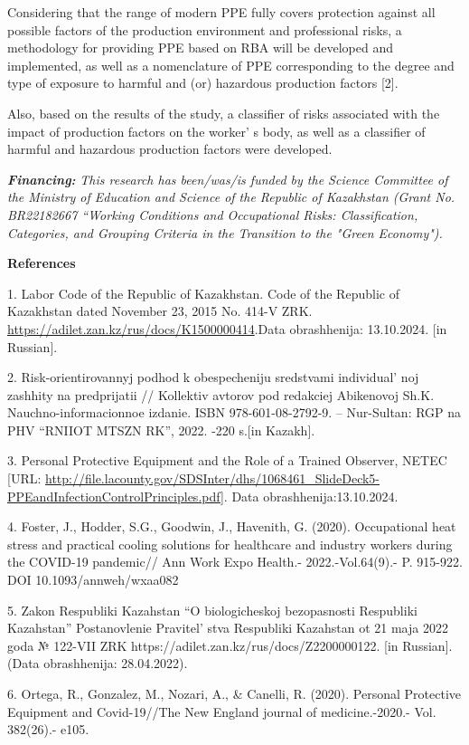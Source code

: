 {Considering that the range of modern PPE fully covers protection against
all possible factors of the production environment and professional
risks, a methodology for providing PPE based on RBA will be developed
and implemented, as well as a nomenclature of PPE corresponding to the
degree and type of exposure to harmful and (or) hazardous production
factors {[}2{]}.

Also, based on the results of the study, a classifier of risks
associated with the impact of production factors on the
worker' s body, as well as a classifier of harmful and
hazardous production factors were developed.

\emph{{\bfseries Financing:}} \emph{This research has been/was/is funded by
the Science Committee of the Ministry of Education and Science of the
Republic of Kazakhstan (Grant No. BR22182667 ``Working Conditions and
Occupational Risks: Classification, Categories, and Grouping Criteria in
the Transition to the "Green Economy").}

{\bfseries References}

1. Labor Code of the Republic of Kazakhstan. Code of the Republic of
Kazakhstan dated November 23, 2015 No. 414-V ZRK.
\url{https://adilet.zan.kz/rus/docs/K1500000414}.Data obrashhenija:
13.10.2024. {[}in Russian{]}.

2. Risk-orientirovannyj podhod k obespecheniju sredstvami
individual' noj zashhity na predprijatii // Kollektiv
avtorov pod redakciej Abikenovoj Sh.K. Nauchno-informacionnoe izdanie.
ISBN 978-601-08-2792-9. -- Nur-Sultan: RGP na PHV ``RNIIOT MTSZN RK'',
2022. -220 s.{[}in Kazakh{]}.

3. Personal Protective Equipment and the Role of a Trained Observer,
NETEC {[}URL:
\url{http://file.lacounty.gov/SDSInter/dhs/1068461_SlideDeck5-PPEandInfectionControlPrinciples.pdf}{]}.
Data obrashhenija:13.10.2024.

4. Foster, J., Hodder, S.G., Goodwin, J., Havenith, G. (2020).
Occupational heat stress and practical cooling solutions for healthcare
and industry workers during the COVID-19 pandemic// Ann Work Expo
Health.- 2022.-Vol.64(9).- P. 915-922. DOI 10.1093/annweh/wxaa082

5. Zakon Respubliki Kazahstan ``O biologicheskoj bezopasnosti Respubliki
Kazahstan'' Postanovlenie Pravitel' stva Respubliki
Kazahstan ot 21 maja 2022 goda № 122-VII ZRK
https://adilet.zan.kz/rus/docs/Z2200000122. {[}in Russian{]}. (Data
obrashhenija: 28.04.2022).

6. Ortega, R., Gonzalez, M., Nozari, A., \& Canelli, R. (2020). Personal
Protective Equipment and Covid-19//The New England journal of
medicine.-2020.- Vol. 382(26).- e105.

}
